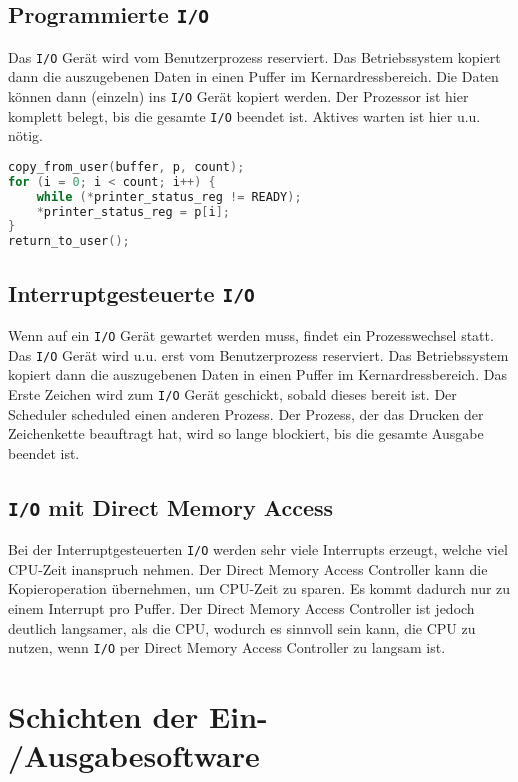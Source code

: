 \subsection{Programmierte \texttt{I/O}}

Das \texttt{I/O} Gerät wird vom Benutzerprozess reserviert. Das Betriebssystem
kopiert dann die auszugebenen Daten in einen Puffer im Kernardressbereich. Die
Daten können dann (einzeln) ins \texttt{I/O} Gerät kopiert werden. Der
Prozessor ist hier komplett belegt, bis die gesamte \texttt{I/O} beendet ist.
Aktives warten ist hier u.u. nötig.

\begin{lstlisting}[language=C]
copy_from_user(buffer, p, count);
for (i = 0; i < count; i++) {
    while (*printer_status_reg != READY);
    *printer_status_reg = p[i];
}
return_to_user();
\end{lstlisting}

\subsection{Interruptgesteuerte \texttt{I/O}}

Wenn auf ein \texttt{I/O} Gerät gewartet werden muss, findet ein Prozesswechsel
statt. Das \texttt{I/O} Gerät wird u.u. erst vom Benutzerprozess reserviert.
Das Betriebssystem kopiert dann die auszugebenen Daten in einen Puffer im
Kernardressbereich. Das Erste Zeichen wird zum \texttt{I/O} Gerät geschickt,
sobald dieses bereit ist. Der Scheduler scheduled einen anderen Prozess. Der
Prozess, der das Drucken der Zeichenkette beauftragt hat, wird so lange
blockiert, bis die gesamte Ausgabe beendet ist.

\subsection{\texttt{I/O} mit Direct Memory Access}

Bei der Interruptgesteuerten \texttt{I/O} werden sehr viele Interrupts erzeugt,
welche viel CPU-Zeit inanspruch nehmen. Der Direct Memory Access Controller
kann die Kopieroperation übernehmen, um CPU-Zeit zu sparen. Es kommt dadurch
nur zu einem Interrupt pro Puffer. Der Direct Memory Access Controller ist
jedoch deutlich langsamer, als die CPU, wodurch es sinnvoll sein kann, die CPU
zu nutzen, wenn \texttt{I/O} per Direct Memory Access Controller zu langsam
ist.

\section{Schichten der Ein- /Ausgabesoftware}


